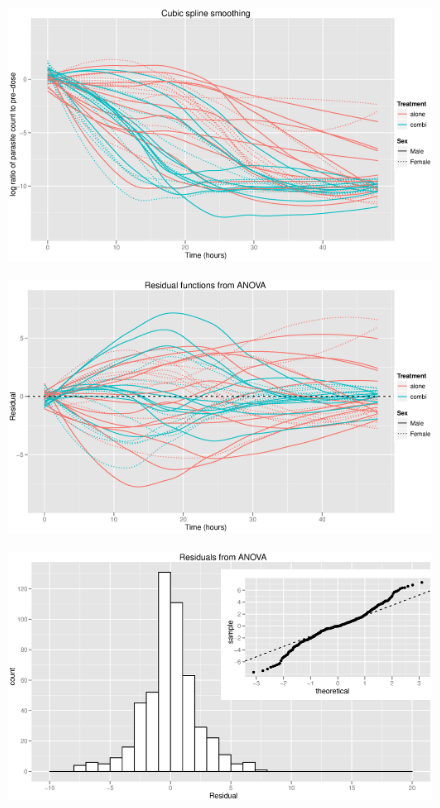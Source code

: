 \begin{figure}[h]
\includegraphics[width=150mm]{cubicspline.eps} 
\caption{}
\label{cubicspline}
\end{figure}
\begin{figure}[h]
\includegraphics[width=150mm]{fdaresids.eps} 
\caption{}
\label{fdaresids}
\end{figure}
\begin{figure}[h]
\includegraphics[width=150mm]{fdahistqq.eps} 
\caption{}
\label{fdahistqq}
\end{figure}
